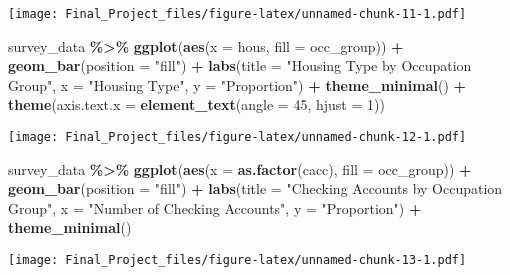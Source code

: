 \documentclass[
]{article}
\newenvironment{Shaded}{\begin{snugshade}}{\end{snugshade}}
\newcommand{\AttributeTok}[1]{\textcolor[rgb]{0.13,0.29,0.53}{#1}}
\newcommand{\DecValTok}[1]{\textcolor[rgb]{0.00,0.00,0.81}{#1}}
\newcommand{\FunctionTok}[1]{\textcolor[rgb]{0.13,0.29,0.53}{\textbf{#1}}}
\newcommand{\NormalTok}[1]{#1}
\newcommand{\SpecialCharTok}[1]{\textcolor[rgb]{0.81,0.36,0.00}{\textbf{#1}}}
\newcommand{\StringTok}[1]{\textcolor[rgb]{0.31,0.60,0.02}{#1}}
\begin{document}
\texttt{[image: Final\_Project\_files/figure-latex/unnamed-chunk-11-1.pdf]}

\begin{Shaded}
\begin{Highlighting}[]
\NormalTok{survey\_data }\SpecialCharTok{\%\textgreater{}\%}
  \FunctionTok{ggplot}\NormalTok{(}\FunctionTok{aes}\NormalTok{(}\AttributeTok{x =}\NormalTok{ hous, }\AttributeTok{fill =}\NormalTok{ occ\_group)) }\SpecialCharTok{+}
  \FunctionTok{geom\_bar}\NormalTok{(}\AttributeTok{position =} \StringTok{"fill"}\NormalTok{) }\SpecialCharTok{+}
  \FunctionTok{labs}\NormalTok{(}\AttributeTok{title =} \StringTok{"Housing Type by Occupation Group"}\NormalTok{,}
       \AttributeTok{x =} \StringTok{"Housing Type"}\NormalTok{, }\AttributeTok{y =} \StringTok{"Proportion"}\NormalTok{) }\SpecialCharTok{+}
  \FunctionTok{theme\_minimal}\NormalTok{() }\SpecialCharTok{+}
  \FunctionTok{theme}\NormalTok{(}\AttributeTok{axis.text.x =} \FunctionTok{element\_text}\NormalTok{(}\AttributeTok{angle =} \DecValTok{45}\NormalTok{, }\AttributeTok{hjust =} \DecValTok{1}\NormalTok{))}
\end{Highlighting}
\end{Shaded}

\texttt{[image: Final\_Project\_files/figure-latex/unnamed-chunk-12-1.pdf]}

\begin{Shaded}
\begin{Highlighting}[]
\NormalTok{survey\_data }\SpecialCharTok{\%\textgreater{}\%}
  \FunctionTok{ggplot}\NormalTok{(}\FunctionTok{aes}\NormalTok{(}\AttributeTok{x =} \FunctionTok{as.factor}\NormalTok{(cacc), }\AttributeTok{fill =}\NormalTok{ occ\_group)) }\SpecialCharTok{+}
  \FunctionTok{geom\_bar}\NormalTok{(}\AttributeTok{position =} \StringTok{"fill"}\NormalTok{) }\SpecialCharTok{+}
  \FunctionTok{labs}\NormalTok{(}\AttributeTok{title =} \StringTok{"Checking Accounts by Occupation Group"}\NormalTok{,}
       \AttributeTok{x =} \StringTok{"Number of Checking Accounts"}\NormalTok{, }\AttributeTok{y =} \StringTok{"Proportion"}\NormalTok{) }\SpecialCharTok{+}
  \FunctionTok{theme\_minimal}\NormalTok{()}
\end{Highlighting}
\end{Shaded}

\texttt{[image: Final\_Project\_files/figure-latex/unnamed-chunk-13-1.pdf]}
\end{document}
